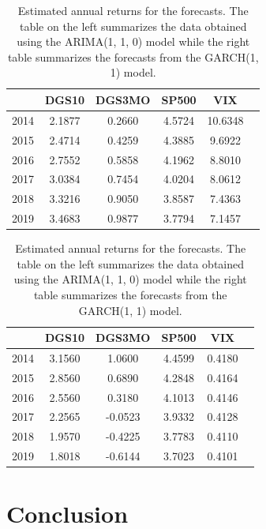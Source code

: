 \documentclass[a4paper, 11pt, twoside]{article}
\theoremstyle{definition} %
\numberwithin{equation}{section}
\begin{document}
  \begin{table}[h!]
    \begin{center}
      \begin{tabular}{r|ccccc}
      \hline
      \rowcolor{gray!45}  & DGS10 & DGS3MO & SP500 & VIX \\
      \hline
      \hline
      \rowcolor{gray!23} 2014 & 2.1877 & 0.2660 & 4.5724 & 10.6348 \\
      \rowcolor{gray!7} 2015 & 2.4714 & 0.4259 & 4.3885 & 9.6922 \\
      \rowcolor{gray!23} 2016 & 2.7552 & 0.5858 & 4.1962 & 8.8010 \\
      \rowcolor{gray!7} 2017 & 3.0384 & 0.7454 & 4.0204 & 8.0612 \\
      \rowcolor{gray!23} 2018 & 3.3216 & 0.9050 & 3.8587 & 7.4363 \\
      \rowcolor{gray!7} 2019 & 3.4683 & 0.9877 & 3.7794 & 7.1457 \\
      \bottomrule
      \end{tabular}
      \hspace{.5cm}
      \begin{tabular}{r|ccccc}
      \hline
      \rowcolor{gray!45}  & DGS10 & DGS3MO & SP500 & VIX \\
      \hline
      \hline
      \rowcolor{gray!23} 2014 & 3.1560 & 1.0600 & 4.4599 & 0.4180 \\
      \rowcolor{gray!7} 2015 & 2.8560 & 0.6890 & 4.2848 & 0.4164 \\
      \rowcolor{gray!23} 2016 & 2.5560 & 0.3180 & 4.1013 & 0.4146 \\
      \rowcolor{gray!7} 2017 & 2.2565 & -0.0523 & 3.9332 & 0.4128 \\
      \rowcolor{gray!23} 2018 & 1.9570 & -0.4225 & 3.7783 & 0.4110 \\
      \rowcolor{gray!7} 2019 & 1.8018 & -0.6144 & 3.7023 & 0.4101 \\
      \bottomrule
      \end{tabular}
      \captionsetup{width=5.5in}
      \caption{\small Estimated annual returns for the forecasts. The table on the left summarizes the data obtained using the ARIMA(1, 1, 0) model while the right table summarizes the forecasts from the GARCH(1, 1) model.}
      \label{tab:forecast_returns}
    \end{center}
  \end{table}

\section{Conclusion} \label{sec:conclusion}
\end{document}

